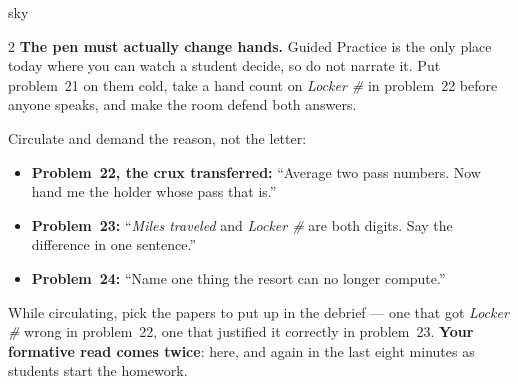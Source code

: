 \documentclass[10pt]{article}
\begin{document}
\begin{skillbox}{sky}
\begin{multicols}{2}
\textbf{The pen must actually change hands.} Guided Practice is the only place today where you
can watch a student decide, so do not narrate it. Put problem~21 on them cold, take a hand count
on \emph{Locker \#} in problem~22 before anyone speaks, and make the room defend both answers.

Circulate and demand the reason, not the letter:
\begin{itemize}[leftmargin=1.1em, nosep]
  \item \textbf{Problem~22, the crux transferred:} ``Average two pass numbers. Now hand me the
        holder whose pass that is.''
  \item \textbf{Problem~23:} ``\emph{Miles traveled} and \emph{Locker \#} are both digits. Say
        the difference in one sentence.''
  \item \textbf{Problem~24:} ``Name one thing the resort can no longer compute.''
\end{itemize}
While circulating, pick the papers to put up in the debrief --- one that got \emph{Locker \#}
wrong in problem~22, one that justified it correctly in problem~23. \textbf{Your formative read
comes twice}: here, and again in the last eight minutes as students start the homework.
\end{multicols}
\end{skillbox}
\end{document}

